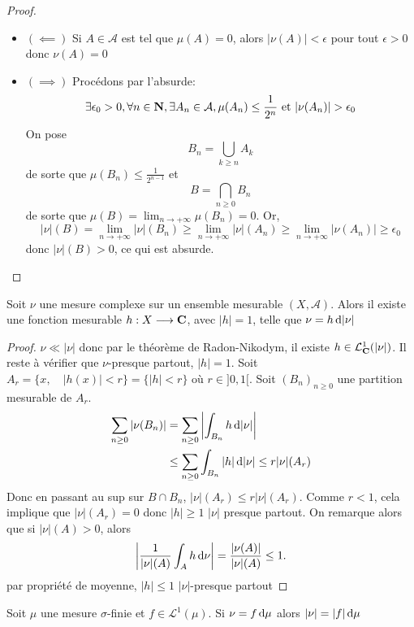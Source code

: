\begin{proof}~
\begin{itemize}
    \item $(\impliedby )$ Si $A \in  \mathcal  A$ est tel que $\mu(A)=0$, alors  $|\nu(A)|<\epsilon$ pour tout $ \epsilon>0$ donc $\nu(A)=0$
    \item  $(\implies )$ Procédons par l'absurde: \[
            \exists  \epsilon_0>0, \forall  n \in  \mathbf N, \exists  A_n \in  \mathcal  A, \mu(A_n)\leq \frac1{2^n}\text{ et } |\nu(A_n)| >\epsilon_0
    \] 
    On pose \[B_n=\bigcup_{k\geq n}A_k\] de sorte que $\mu(B_n)\leq \frac1{2^{n-1}}$ et \[
    B = \bigcap_{n\geq 0}B_n
    \] 
    de sorte que $\mu(B)=\lim_{n\to +\infty} \mu\left( B_n \right) =0$. Or, \[
        |\nu|(B)=\lim_{n\to +\infty}|\nu|(B_n)\geq \lim_{n\to +\infty} |\nu|(A_n)\geq \lim_{n\to +\infty} |\nu(A_n)|\geq \epsilon_0
    \] 
    donc $|\nu|(B)>0$, ce qui est absurde.
\end{itemize}
\end{proof}

\begin{thm}
    Soit $\nu$ une mesure complexe sur un ensemble mesurable $(X, \mathcal  A)$. Alors il existe une fonction mesurable $h : X \longrightarrow \mathbf C$, avec $|h|=1$, telle que $\nu=h\mathop{}\!\mathrm d |\nu|$
\end{thm}

\begin{proof}
    $\nu\ll|\nu|$ donc par le théorème de Radon-Nikodym, il existe  $h \in  \mathcal  L^1_{\mathbf C}(|\nu|)$. Il reste à vérifier que $\nu$-presque partout,  $|h|=1$. 
    Soit $A_r=\{x, \quad  |h(x)|<r\}= \{|h|<r\}$ où $r\in ]0,1[$. Soit $(B_n)_{n\geq 0}$ une partition mesurable de $A_r$.
    \begin{align*}
        \sum_{n\geq 0}|\nu(B_n)| &= \sum_{n\geq 0}\left| \int_{B_n}h\mathop{}\!\mathrm d|\nu|\right|\\
&\leq \sum_{n\geq0}\int_{B_n}|h|\mathop{}\!\mathrm d|\nu|\leq r|\nu|(A_r)
\end{align*}  
Donc en passant au sup sur $B\cap B_n$, $|\nu|(A_r)\leq r|\nu|(A_r)$.
Comme $r<1$, cela implique que $|\nu|(A_r)=0$ donc $|h|\geq 1$ $|\nu|$ presque partout.
On remarque alors que si $|\nu|(A)>0$, alors \[ \left| \frac{1}{|\nu|(A)}\int_Ah\mathop{}\!\mathrm d\nu\right| = \frac{|\nu(A)|}{|\nu|(A)}\leq 1.\]
par propriété de moyenne,  $|h|\leq 1$ $|\nu|$-presque partout %
\end{proof}

\begin{cor}
    Soit $\mu$ une mesure  $\sigma$-finie et  $f \in  \mathcal  L^1(\mu)$. Si $\nu=f\mathop{}\!\mathrm d\mu$ alors  $|\nu|=|f|\mathop{}\!\mathrm d \mu$
\end{cor}

